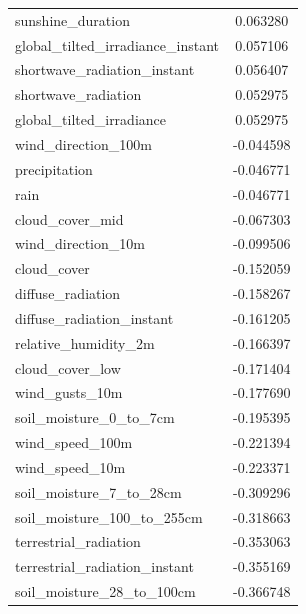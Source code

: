 \begin{table}[H]
\begin{tabular}{lc}
		sunshine\_duration                   & 0.063280    \\ 
		global\_tilted\_irradiance\_instant    & 0.057106    \\ 
		shortwave\_radiation\_instant         & 0.056407    \\ 
		shortwave\_radiation                 & 0.052975    \\ 
		global\_tilted\_irradiance            & 0.052975    \\ 
		wind\_direction\_100m                & -0.044598   \\ 
		precipitation                      & -0.046771   \\ 
		rain                               & -0.046771   \\ 
		cloud\_cover\_mid                    & -0.067303   \\ 
		wind\_direction\_10m                 & -0.099506   \\ 
		cloud\_cover                        & -0.152059   \\ 
		diffuse\_radiation                  & -0.158267   \\ 
		diffuse\_radiation\_instant          & -0.161205   \\ 
		relative\_humidity\_2m               & -0.166397   \\ 
		cloud\_cover\_low                    & -0.171404   \\ 
		wind\_gusts\_10m                     & -0.177690   \\ 
		soil\_moisture\_0\_to\_7cm             & -0.195395   \\ 
		wind\_speed\_100m                    & -0.221394   \\ 
		wind\_speed\_10m                     & -0.223371   \\ 
		soil\_moisture\_7\_to\_28cm            & -0.309296   \\ 
		soil\_moisture\_100\_to\_255cm         & -0.318663   \\ 
		terrestrial\_radiation              & -0.353063   \\ 
		terrestrial\_radiation\_instant      & -0.355169   \\ 
		soil\_moisture\_28\_to\_100cm          & -0.366748   \\ 
	\end{tabular}
\end{table}

